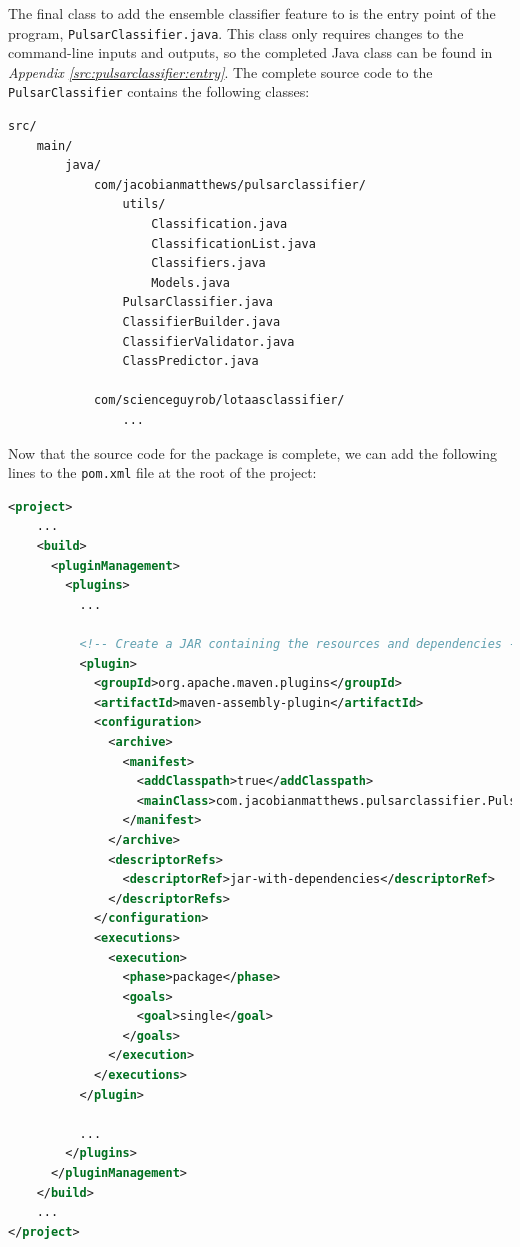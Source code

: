 \documentclass{article}
\begin{document}
\begin{appendices}
\begin{subappendices}
The final class to add the ensemble classifier feature to is the entry point of the program, \verb|PulsarClassifier.java|. This class only requires changes to the command-line inputs and outputs, so the completed Java class can be found in \emph{Appendix \ref{src:pulsarclassifier:entry}}. The complete source code to the \verb|PulsarClassifier| contains the following classes:

\begin{lstlisting}[numbers=none]
src/
    main/
        java/
            com/jacobianmatthews/pulsarclassifier/
                utils/
                    Classification.java
                    ClassificationList.java
                    Classifiers.java
                    Models.java
                PulsarClassifier.java
                ClassifierBuilder.java
                ClassifierValidator.java
                ClassPredictor.java

            com/scienceguyrob/lotaasclassifier/
                ...

\end{lstlisting}

Now that the source code for the package is complete, we can add the following lines to the \verb|pom.xml| file at the root of the project:

\begin{lstlisting}[numbers=none, language=xml, title=pom.xml, basicstyle=\footnotesize\ttfamily]
<project>
    ...
    <build>
      <pluginManagement>
        <plugins>
          ...

          <!-- Create a JAR containing the resources and dependencies -->
          <plugin>
            <groupId>org.apache.maven.plugins</groupId>
            <artifactId>maven-assembly-plugin</artifactId>
            <configuration>
              <archive>
                <manifest>
                  <addClasspath>true</addClasspath>
                  <mainClass>com.jacobianmatthews.pulsarclassifier.PulsarClassifier</mainClass>
                </manifest>
              </archive>
              <descriptorRefs>
                <descriptorRef>jar-with-dependencies</descriptorRef>
              </descriptorRefs>
            </configuration>
            <executions>
              <execution>
                <phase>package</phase>
                <goals>
                  <goal>single</goal>
                </goals>
              </execution>
            </executions>
          </plugin>

          ...
        </plugins>
      </pluginManagement>
    </build>
    ...
</project>
\end{lstlisting}


\end{subappendices}
\end{appendices}
\end{document}
